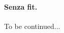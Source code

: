 \documentclass[a4paper,10pt]{article}
\renewcommand{\c}{$\clubsuit$\xspace}
\renewcommand{\d}{$\diamondsuit$\xspace}
\newcommand{\h}{$\heartsuit$\xspace}
\newcommand{\s}{$\spadesuit$\xspace}
\newcommand{\sa}{SA\xspace}
\newcommand{\smallspace}{\vskip0.3cm}
\renewcommand{\tabcolsep}{0.3cm}
\newenvironment{twocol}
{\smallspace\noindent\tabularx{\linewidth}{ l X }}%
{\endtabularx\smallspace}
\newcommand{\biddingtable}[2][0.4cm]{
	\needspace{1cm}
	\marginnote{
		\scriptsize{
			\def\arraystretch{1.5}
			\renewcommand{\tabcolsep}{0.1cm}
			\begin{tabular}{|>{\centering\arraybackslash}p{0.6cm}>{\centering\arraybackslash}p{0.6cm}>{\centering\arraybackslash}p{0.6cm}>{\centering\arraybackslash}p{0.6cm}|}
				\hline
				#2
			\end{tabular}
		}
	}[#1]
}
\begin{document}
\paragraph{Senza fit.} To be continued...

%
%
%
%
%
%
%
\end{document}
